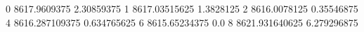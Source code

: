0 8617.9609375 2.30859375
1 8617.03515625 1.3828125
2 8616.0078125 0.35546875
4 8616.287109375 0.634765625
6 8615.65234375 0.0
8 8621.931640625 6.279296875
